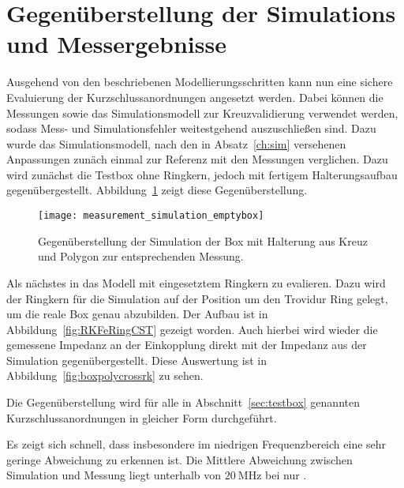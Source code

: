 \section{Gegen\"uberstellung der Simulations und Messergebnisse}
Ausgehend von den beschriebenen Modellierungsschritten kann nun eine sichere Evaluierung der Kurzschlussanordnungen angesetzt werden. Dabei k\"onnen die Messungen sowie das Simulationsmodell zur Kreuzvalidierung verwendet werden, sodass Mess- und Simulationsfehler weitestgehend auszuschlie\ss{}en sind. Dazu wurde das Simulationsmodell, nach den in Absatz~\ref{ch:sim} versehenen Anpassungen zun\"ach einmal zur Referenz mit den Messungen verglichen. Dazu wird zun\"achst die Testbox ohne Ringkern, jedoch mit fertigem Halterungsaufbau gegen\"ubergestellt. Abbildung~\ref{fig:boxpolycross} zeigt diese Gegen\"uberstellung.
\begin{figure}[htb]
	\centering
	\texttt{[image: measurement\_simulation\_emptybox]}
	\caption{Gegen\"uberstellung der Simulation der Box mit Halterung aus Kreuz und Polygon zur entsprechenden Messung.}
	\label{fig:boxpolycross}
\end{figure}
\par
Als n\"achstes in das Modell mit eingesetztem Ringkern zu evalieren. Dazu wird der Ringkern f\"ur die Simulation auf der Position um den Trovidur Ring gelegt, um die reale Box genau abzubilden. Der Aufbau ist in Abbildung~\ref{fig:RKFeRingCST} gezeigt worden. Auch hierbei wird wieder die gemessene Impedanz an der Einkopplung direkt mit der Impedanz aus der Simulation gegen\"ubergestellt. Diese Auswertung ist in Abbildung~\ref{fig:boxpolycrossrk} zu sehen.


\par
Die Gegen\"uberstellung wird f\"ur alle in Abschnitt~\ref{sec:testbox} genannten Kurzschlussanordnungen in gleicher Form durchgef\"uhrt.

\par
Es zeigt sich schnell, dass insbesondere im niedrigen Frequenzbereich eine sehr geringe Abweichung zu erkennen ist. Die Mittlere Abweichung zwischen Simulation und Messung liegt unterhalb von $\SI{20}{\mega\hertz}$ bei nur .   


